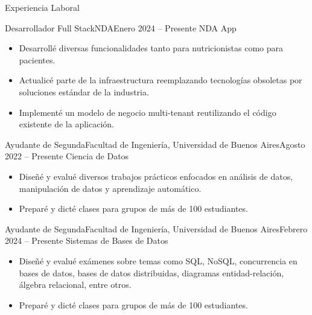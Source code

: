 \documentclass[]{mcdowellcv}
\begin{document}
	\makeheader
	
	\begin{cvsection}{Experiencia Laboral}
		\begin{cvsubsection}{Desarrollador Full Stack}{NDA}{Enero 2024 -- Presente}
			NDA App
			\begin{itemize}
				\item Desarrollé diversas funcionalidades tanto para nutricionistas como para pacientes.
				\item Actualicé parte de la infraestructura reemplazando tecnologías obsoletas por soluciones estándar de la industria.
				\item Implementé un modelo de negocio multi-tenant reutilizando el código existente de la aplicación.
			\end{itemize}
		\end{cvsubsection}
		
		\begin{cvsubsection}{Ayudante de Segunda}{Facultad de Ingeniería, Universidad de Buenos Aires}{Agosto 2022 -- Presente}
			Ciencia de Datos
			\begin{itemize}
				\item Diseñé y evalué diversos trabajos prácticos enfocados en análisis de datos, manipulación de datos y aprendizaje automático.
				\item Preparé y dicté clases para grupos de más de 100 estudiantes.
			\end{itemize}
		\end{cvsubsection}
		
		\begin{cvsubsection}{Ayudante de Segunda}{Facultad de Ingeniería, Universidad de Buenos Aires}{Febrero 2024 -- Presente}
			Sistemas de Bases de Datos
			\begin{itemize}
				\item Diseñé y evalué exámenes sobre temas como SQL, NoSQL, concurrencia en bases de datos, bases de datos distribuidas, diagramas entidad-relación, álgebra relacional, entre otros.
				\item Preparé y dicté clases para grupos de más de 100 estudiantes.
			\end{itemize}
		\end{cvsubsection}
	\end{cvsection}
	
\end{document}
